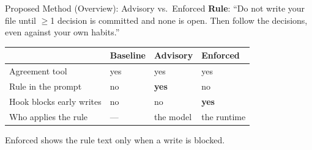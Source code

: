 \documentclass[aspectratio=169,11pt]{beamer}
\begin{document}
\begin{frame}{Proposed Method (Overview): Advisory vs.\ Enforced}
  \small
  \textbf{Rule}: ``Do not write your file until $\geq$1 decision is committed and none is open.
  Then follow the decisions, even against your own habits.''
  \vspace{0.5em}

  \begin{tabular}{p{3.6cm}p{3.0cm}p{3.0cm}p{3.0cm}}
    \toprule
    & Baseline & Advisory & Enforced \\
    \midrule
    Agreement tool & yes & yes & yes \\
    \leavevmode\pause Rule in the prompt & no & \textbf{yes} & no \\
    \leavevmode\pause Hook blocks early writes & no & no & \textbf{yes} \\
    \leavevmode\pause Who applies the rule & --- & the model & the runtime \\
    \bottomrule
  \end{tabular}

  \vspace{0.5em}
  \pause\footnotesize Enforced shows the rule text only when a write is blocked.
\end{frame}

\end{document}
